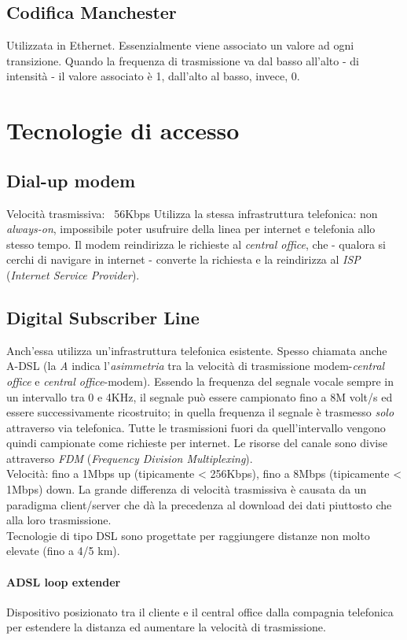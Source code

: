 \subsection{Codifica Manchester}
Utilizzata in Ethernet. Essenzialmente viene associato un valore ad ogni transizione. Quando la frequenza di trasmissione va dal basso all'alto - di intensità - il valore associato è 1, dall'alto al basso, invece, 0.

\section{Tecnologie di accesso}
\subsection{Dial-up modem}
Velocità trasmissiva: ~56Kbps
Utilizza la stessa infrastruttura telefonica: non \textit{always-on}, impossibile poter usufruire della linea per internet e telefonia allo stesso tempo.
Il modem reindirizza le richieste al \textit{central office}, che - qualora si cerchi di navigare in internet - converte la richiesta e la reindirizza al \textit{ISP} (\textit{Internet Service Provider}).

\subsection{Digital Subscriber Line}
Anch'essa utilizza un'infrastruttura telefonica esistente. Spesso chiamata anche A-DSL (la \textit{A} indica l'\textit{asimmetria} tra la velocità di trasmissione modem-\textit{central office} e \textit{central office}-modem).
Essendo la frequenza del segnale vocale sempre in un intervallo tra 0 e 4KHz, il segnale può essere campionato fino a 8M volt/s ed essere successivamente ricostruito; in quella frequenza il segnale è trasmesso \textit{solo} attraverso via telefonica. Tutte le trasmissioni fuori da quell'intervallo vengono quindi campionate come richieste per internet.
Le risorse del canale sono divise attraverso \textit{FDM} (\textit{Frequency Division Multiplexing}).\\
Velocità: fino a 1Mbps up (tipicamente < 256Kbps), fino a 8Mbps (tipicamente < 1Mbps) down. La grande differenza di velocità trasmissiva è causata da un paradigma client/server che dà la precedenza al download dei dati piuttosto che alla loro trasmissione.
\\
Tecnologie di tipo DSL sono progettate per raggiungere distanze non molto elevate (fino a 4/5 km).
\paragraph{ADSL loop extender} 
Dispositivo posizionato tra il cliente e il central office dalla compagnia telefonica per estendere la distanza ed aumentare la velocità di trasmissione.

